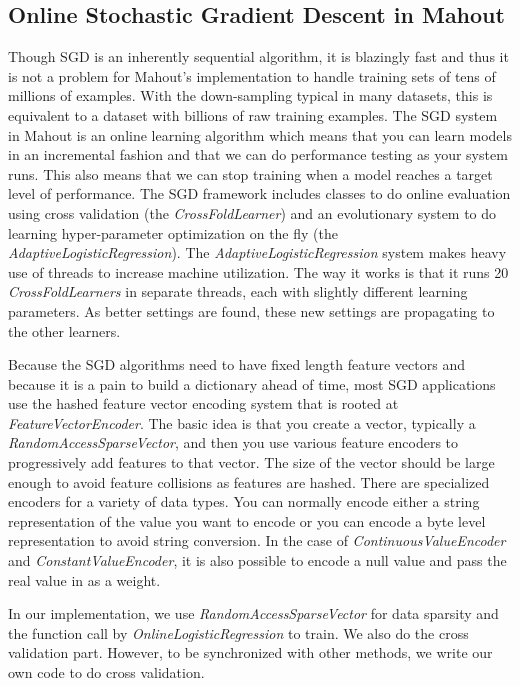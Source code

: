 \documentclass{llncs}
\begin{document}
\subsection{Online Stochastic Gradient Descent in Mahout}
Though SGD is an inherently sequential algorithm, it is blazingly fast and thus it is not a problem for Mahout's implementation to handle training sets of tens of millions of examples.
With the down-sampling typical in many datasets, this is equivalent to a dataset with billions of raw training examples.
The SGD system in Mahout is an online learning algorithm which means that you can learn models in an incremental fashion and that we can do performance testing as your system runs.
This also means that we can stop training when a model reaches a target level of performance.
The SGD framework includes classes to do online evaluation using cross validation (the \textit{CrossFoldLearner}) and an evolutionary system to do learning hyper-parameter optimization on the fly (the \textit{AdaptiveLogisticRegression}).
The \textit{AdaptiveLogisticRegression} system makes heavy use of threads to increase machine utilization.
The way it works is that it runs 20 \textit{CrossFoldLearners} in separate threads, each with slightly different learning parameters.
As better settings are found, these new settings are propagating to the other learners.

Because the SGD algorithms need to have fixed length feature vectors and because it is a pain to build a dictionary ahead of time, most SGD applications use the hashed feature vector encoding system that is rooted at \textit{FeatureVectorEncoder}.
The basic idea is that you create a vector, typically a \textit{RandomAccessSparseVector}, and then you use various feature encoders to progressively add features to that vector.
The size of the vector should be large enough to avoid feature collisions as features are hashed.
There are specialized encoders for a variety of data types.
You can normally encode either a string representation of the value you want to encode or you can encode a byte level representation to avoid string conversion.
In the case of \textit{ContinuousValueEncoder} and \textit{ConstantValueEncoder}, it is also possible to encode a null value and pass the real value in as a weight.

In our implementation, we use \textit{RandomAccessSparseVector} for data sparsity and the function call by \textit{OnlineLogisticRegression} to train.
We also do the cross validation part. However, to be synchronized with other methods, we write our own code to do cross validation.
	
\end{document}
